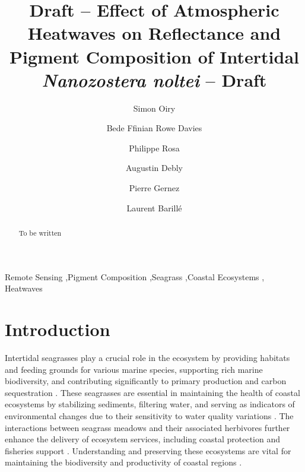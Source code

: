 \documentclass[
  number]{elsarticle}
\begin{document}
\begin{frontmatter}
\title{Draft -- Effect of Atmospheric Heatwaves on Reflectance and
Pigment Composition of Intertidal \emph{Nanozostera noltei} -- Draft}
\author[1]{Simon Oiry%
%
}
\author[1]{Bede Ffinian Rowe Davies%
%
}

\author[1]{Philippe Rosa%
%
}

\author[1]{Augustin Debly%
%
}

\author[1]{Pierre Gernez%
%
}

\author[1]{Laurent Barillé%
%
}









        
\begin{abstract}
To be written
\end{abstract}





\begin{keyword}
    Remote Sensing \sep Pigment Composition \sep Seagrass \sep Coastal
Ecosystems \sep 
    Heatwaves
\end{keyword}
\end{frontmatter}
    
\section{Introduction}\label{introduction}

Intertidal seagrasses play a crucial role in the ecosystem by providing
habitats and feeding grounds for various marine species, supporting rich
marine biodiversity, and contributing significantly to primary
production and carbon sequestration
\citep{unsworth2022planetary, sousa2019blue}. These seagrasses are
essential in maintaining the health of coastal ecosystems by stabilizing
sediments, filtering water, and serving as indicators of environmental
changes due to their sensitivity to water quality variations
\citep{zoffoli2021decadal}. The interactions between seagrass meadows
and their associated herbivores further enhance the delivery of
ecosystem services, including coastal protection and fisheries support
\citep{jankowska2019stabilizing, zoffoli2023remote, gardner2018global}.
Understanding and preserving these ecosystems are vital for maintaining
the biodiversity and productivity of coastal regions
\citep{scott2018role, ramesh2020seagrass}.
\end{document}
